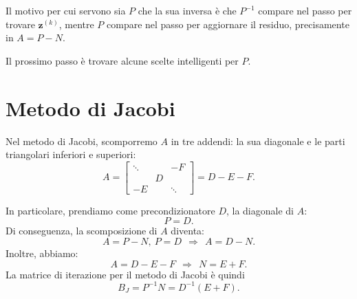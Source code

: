 Il motivo per cui servono sia $P$ che la sua inversa è che $P^{-1}$ compare nel passo per trovare $\mathbf{z}^{(k)}$, mentre $P$ compare nel passo per aggiornare il residuo, precisamente in $A=P-N$.

Il prossimo passo è trovare alcune scelte intelligenti per $P$.

\section{Metodo di Jacobi}
Nel metodo di Jacobi, scomporremo $A$ in tre addendi: la sua diagonale e le parti triangolari inferiori e superiori:
\begin{equation*}
A=\begin{bmatrix}
\ddots  &  & -F\\
 & D & \\
-E &  & \ddots
\end{bmatrix} =D-E-F.
\end{equation*}

In particolare, prendiamo come precondizionatore $D$, la diagonale di $A$:
\begin{equation*}
P=D.
\end{equation*}
Di conseguenza, la scomposizione di $A$ diventa:
\begin{equation*}
A=P-N,\ P=D\ \ \Rightarrow \ \ A=D-N.
\end{equation*}
Inoltre, abbiamo:
\begin{equation*}
A=D-E-F\ \ \Rightarrow \ \ N=E+F.
\end{equation*}
La matrice di iterazione per il metodo di Jacobi è quindi
\begin{equation*}
B_{J} =P^{-1} N=D^{-1}( E+F) .
\end{equation*}

